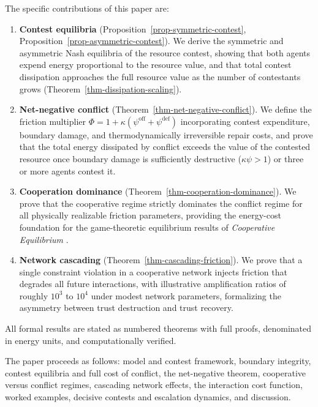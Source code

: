 \documentclass[11pt]{article}
\theoremstyle{plain}
\theoremstyle{definition}
\theoremstyle{remark}
\begin{document}
The specific contributions of this paper are:

\begin{enumerate}
\def\labelenumi{\arabic{enumi}.}
\item
  \textbf{Contest equilibria} (Proposition~\ref{prop-symmetric-contest},
  Proposition~\ref{prop-asymmetric-contest}). We derive the symmetric
  and asymmetric Nash equilibria of the resource contest, showing that
  both agents expend energy proportional to the resource value, and that
  total contest dissipation approaches the full resource value as the
  number of contestants grows (Theorem~\ref{thm-dissipation-scaling}).
\item
  \textbf{Net-negative conflict}
  (Theorem~\ref{thm-net-negative-conflict}). We define the friction
  multiplier
  \(\Phi = 1 + \kappa(\psi^{\text{off}} + \psi^{\text{def}})\)
  incorporating contest expenditure, boundary damage, and
  thermodynamically irreversible repair costs, and prove that the total
  energy dissipated by conflict exceeds the value of the contested
  resource once boundary damage is sufficiently destructive
  (\(\kappa\psi > 1\)) or three or more agents contest it.
\item
  \textbf{Cooperation dominance}
  (Theorem~\ref{thm-cooperation-dominance}). We prove that the
  cooperative regime strictly dominates the conflict regime for all
  physically realizable friction parameters, providing the energy-cost
  foundation for the game-theoretic equilibrium results of
  \emph{Cooperative Equilibrium} \citep{TC-V}.
\item
  \textbf{Network cascading} (Theorem~\ref{thm-cascading-friction}). We
  prove that a single constraint violation in a cooperative network
  injects friction that degrades all future interactions, with
  illustrative amplification ratios of roughly \(10^3\) to \(10^4\)
  under modest network parameters, formalizing the asymmetry between
  trust destruction and trust recovery.
\end{enumerate}

All formal results are stated as numbered theorems with full proofs,
denominated in energy units, and computationally verified.

The paper proceeds as follows: model and contest framework, boundary
integrity, contest equilibria and full cost of conflict, the
net-negative theorem, cooperative versus conflict regimes, cascading
network effects, the interaction cost function, worked examples,
decisive contests and escalation dynamics, and discussion.
\end{document}
